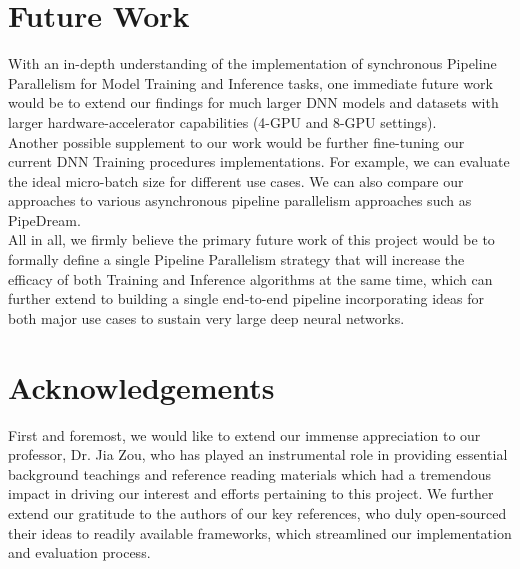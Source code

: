 \documentclass[conference]{IEEEtran}
\begin{document}
\section{Future Work}
With an in-depth understanding of the implementation of synchronous Pipeline Parallelism for Model Training and Inference tasks, one immediate future work would be to extend our findings for much larger DNN models and datasets with larger hardware-accelerator capabilities (4-GPU and 8-GPU settings). \\
Another possible supplement to our work would be further fine-tuning our current DNN Training procedures implementations. For example, we can evaluate the ideal micro-batch size for different use cases. We can also compare our approaches to various asynchronous pipeline parallelism approaches such as PipeDream. \\
All in all, we firmly believe the primary future work of this project would be to formally define a single Pipeline Parallelism strategy that will increase the efficacy of both Training and Inference algorithms at the same time, which can further extend to building a single end-to-end pipeline incorporating ideas for both major use cases to sustain very large deep neural networks.

\section{Acknowledgements}
First and foremost, we would like to extend our immense appreciation to our professor, Dr. Jia Zou, who has played an instrumental role in providing essential background teachings and reference reading materials which had a tremendous impact in driving our interest and efforts pertaining to this project. We further extend our gratitude to the authors of our key references, who duly open-sourced their ideas to readily available frameworks, which streamlined our implementation and evaluation process.
\end{document}
